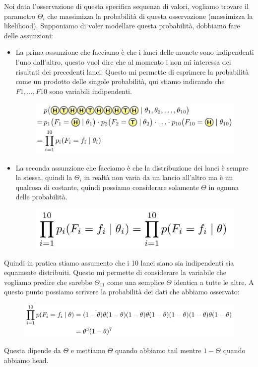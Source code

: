 \documentclass[14pt]{extreport}
\begin{document}
Noi data l'osservazione di questa specifica sequenza di valori, vogliamo trovare il parametro $\Theta_i$ che massimizza la probabilità di questa
osservazione (massimizza la likelihood). Supponiamo di voler modellare questa probabilità, dobbiamo fare delle assunzioni:
\begin{itemize}
\item La prima assunzione che facciamo è che i lanci delle monete sono indipendenti l'uno dall'altro, questo vuol dire che al momento i non mi
interessa dei risultati dei precedenti lanci. Questo mi permette di esprimere la probabilità come un prodotto delle singole probabilità, qui stiamo
indicando che $F1,...,F10$ sono variabili indipendenti. 
\begin{figure}[H]
\centering
  \includegraphics[width=0.88\linewidth]{11.jpeg}
\end{figure}
\item La seconda assunzione che facciamo è che la distribuzione dei lanci è sempre la stessa, quindi la $\Theta_i$ in realtà non varia da un lancio
all'altro ma è un qualcosa di costante, quindi possiamo considerare solamente $\Theta$ in ognuna delle probabilità.
\begin{figure}[H]
\centering
  \includegraphics[width=0.5\linewidth]{13.jpeg}
\end{figure}
\end{itemize}
Quindi in pratica stiamo assumento che i 10 lanci siano sia indipendenti sia equamente distribuiti. Questo mi permette di considerare la variabile che
vogliamo predire che sarebbe $\Theta_{11}$ come una semplice $\Theta$ identica a tutte le altre. A questo punto possiamo scrivere la probabilità dei
dati che abbiamo osservato:
\begin{figure}[H]
\centering
  \includegraphics[width=0.80\linewidth]{14.jpeg}
\end{figure}
Questa dipende da $\Theta$ e mettiamo $\Theta$ quando abbiamo tail mentre $1-\Theta$ quando abbiamo head.\\
\end{document}
